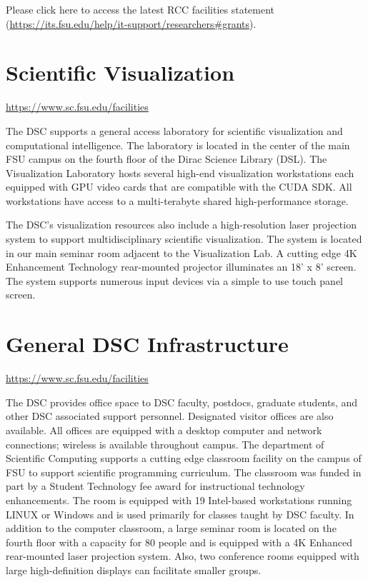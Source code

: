 \documentclass[12pt,a4paper]{article}
\begin{document}
Please click here to access the latest RCC facilities statement (\url{https://its.fsu.edu/help/it-support/researchers#grants}).

\section{Scientific Visualization}
\url{https://www.sc.fsu.edu/facilities}

The DSC supports a general access laboratory for scientific visualization and computational intelligence. The laboratory is located in the center of the main FSU campus on the fourth floor of the Dirac Science Library (DSL). The Visualization Laboratory hosts several high-end visualization workstations each equipped with GPU video cards that are compatible with the CUDA SDK. All workstations have access to a multi-terabyte shared high-performance storage.

\par The DSC's visualization resources also include a high-resolution laser projection system to support multidisciplinary scientific visualization. The system is located in our main seminar room adjacent to the Visualization Lab. A cutting edge 4K Enhancement Technology rear-mounted projector illuminates an 18' x 8' screen. The system supports numerous input devices via a simple to use touch panel screen.

\section{General DSC Infrastructure}
\url{https://www.sc.fsu.edu/facilities}

The DSC provides office space to DSC faculty, postdocs, graduate students, and other DSC associated support personnel. Designated visitor offices are also available. All offices are equipped with a desktop computer and network connections; wireless is available throughout campus. The department of Scientific Computing supports a cutting edge classroom facility on the campus of FSU to support scientific programming curriculum. The classroom was funded in part by a Student Technology fee award for instructional technology enhancements. The room is equipped with 19 Intel-based workstations running LINUX or Windows and is used primarily for classes taught by DSC faculty. In addition to the computer classroom, a large seminar room is located on the fourth floor with a capacity for 80 people and is equipped with a 4K Enhanced rear-mounted laser projection system. Also, two conference rooms equipped with large high-definition displays can facilitate smaller groups.
\end{document}
